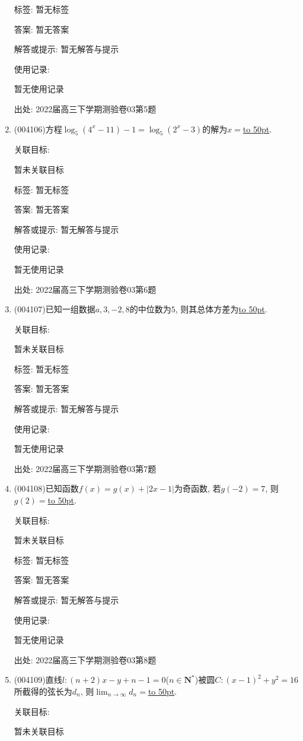 \documentclass[10pt,a4paper]{article}
\newcommand{\blank}[1]{\underline{\hbox to #1pt{}}}
\begin{document}
\begin{enumerate}[1.]
标签: 暂无标签

答案: 暂无答案

解答或提示: 暂无解答与提示

使用记录:

暂无使用记录


出处: 2022届高三下学期测验卷03第5题
\item { (004106)}方程$\log_5(4^x-11)-1=\log_5(2^x-3)$的解为$x=$\blank{50}.


关联目标:

暂未关联目标



标签: 暂无标签

答案: 暂无答案

解答或提示: 暂无解答与提示

使用记录:

暂无使用记录


出处: 2022届高三下学期测验卷03第6题
\item { (004107)}已知一组数据$a,3,-2,8$的中位数为$5$, 则其总体方差为\blank{50}.


关联目标:

暂未关联目标



标签: 暂无标签

答案: 暂无答案

解答或提示: 暂无解答与提示

使用记录:

暂无使用记录


出处: 2022届高三下学期测验卷03第7题
\item { (004108)}已知函数$f(x)=g(x)+|2x-1|$为奇函数, 若$g(-2)=7$, 则$g(2)=$\blank{50}.


关联目标:

暂未关联目标



标签: 暂无标签

答案: 暂无答案

解答或提示: 暂无解答与提示

使用记录:

暂无使用记录


出处: 2022届高三下学期测验卷03第8题
\item { (004109)}直线$l:(n+2)x-y+n-1=0$($n\in \mathbf{N}^*$)被圆$C:(x-1)^2+y^2=16$所截得的弦长为$d_n$, 则$\displaystyle\lim_{n\to \infty}d_n=$\blank{50}.


关联目标:

暂未关联目标




\end{enumerate}
\end{document}
